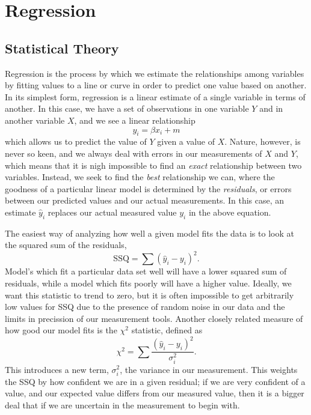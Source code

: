 \chapter{Regression}

\section{Statistical Theory}
Regression is the process by which we estimate the relationships among variables by fitting values to a line or curve in order to predict one value based on another. In its simplest form, regression is a linear estimate of a single variable in terms of another. In this case, we have a set of observations in one variable $Y$ and in another variable $X$, and we see a linear relationship 
\[ y_i = \beta x_i + m \]
which allows us to predict the value of $Y$ given a value of $X$. Nature, however, is never so keen, and we always deal with errors in our measurements of $X$ and $Y$, which means that it is nigh impossible to find an \emph{exact} relationship between two variables. Instead, we seek to find the \emph{best} relationship we can, where the goodness of a particular linear model is determined by the \emph{residuals}, or errors between our predicted values and our actual measurements. In this case, an estimate $\hat{y}_i$ replaces our actual measured value $y_i$ in the above equation.

The easiest way of analyzing how well a given model fits the data is to look at the squared sum of the residuals,
\[ \text{SSQ} = \sum (\hat{y}_i - y_i)^2. \]
Model's which fit a particular data set well will have a lower squared sum of residuals, while a model which fits poorly will have a higher value. Ideally, we want this statistic to trend to zero, but it is often impossible to get arbitrarily low values for SSQ due to the presence of random noise in our data and the limits in precission of our measurement tools. Another closely related measure of how good our model fits is the $\chi^2$ statistic, defined as 
\[ \chi^2 = \sum \frac{(\hat{y}_i - y_i)^2}{\sigma_i^2}. \]
This introduces a new term, $\sigma_i^2$, the variance in our measurement. This weights the SSQ by how confident we are in a given residual; if we are very confident of a value, and our expected value differs from our measured value, then it is a bigger deal that if we are uncertain in the measurement to begin with.

